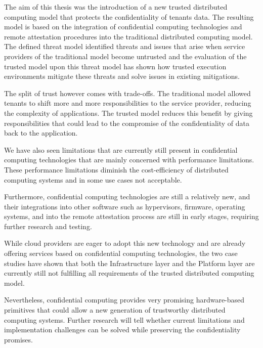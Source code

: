 The aim of this thesis was the introduction of a new trusted distributed
computing model that protects the confidentiality of tenants data. The resulting
model is based on the integration of confidential computing technologies and
remote attestation procedures into the traditional distributed computing model.
The defined threat model identified threats and issues that arise when service
providers of the traditional model become untrusted and the evaluation of the
trusted model upon this threat model has shown how trusted execution
environments mitigate these threats and solve issues in existing mitigations.

The split of trust however comes with trade-offs. The traditional model allowed
tenants to shift more and more responsibilities to the service provider,
reducing the complexity of applications. The trusted model reduces this benefit
by giving responsibilities that could lead to the compromise of the
confidentiality of data back to the application.

We have also seen limitations that are currently still present in confidential
computing technologies that are mainly concerned with performance limitations.
These performance limitations diminish the cost-efficiency of distributed
computing systems and in some use cases not acceptable.

Furthermore, confidential computing technologies are still a relatively new, and
their integrations into other software such as hypervisors, firmware, operating
systems, and into the remote attestation process are still in early stages,
requiring further research and testing.

While cloud providers are eager to adopt this new technology and are already
offering services based on confidential computing technologies, the two case
studies have shown that both the Infrastructure layer and the Platform layer are
currently still not fulfilling all requirements of the trusted distributed
computing model.

Nevertheless, confidential computing provides very promising hardware-based
primitives that could allow a new generation of trustworthy distributed
computing systems. Further research will tell whether current limitations and
implementation challenges can be solved while preserving the confidentiality
promises.
